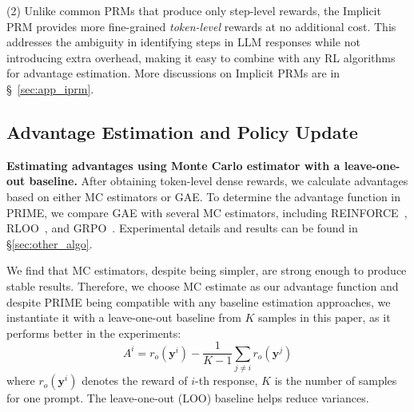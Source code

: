 (2) Unlike common PRMs that produce only step-level rewards, the Implicit PRM provides more fine-grained \textit{token-level} rewards at no additional cost. This addresses the ambiguity in identifying steps in LLM responses while not introducing extra overhead, making it easy to combine with any RL algorithms for advantage estimation. More discussions on Implicit PRMs are in \S~\ref{sec:app_iprm}.

\subsection{Advantage Estimation and Policy Update}
\label{sec:prime_loss_adv}



\textbf{Estimating advantages using Monte Carlo estimator with a leave-one-out baseline.}
After obtaining token-level dense rewards, we calculate advantages based on either MC estimators or GAE.
To determine the advantage function in PRIME, we compare GAE with several MC estimators, including REINFORCE~\citep{williams1992simple}, RLOO~\citep{ahmadian2024back}, and GRPO~\citep{deepseek-math}. Experimental details and results can be found in \S \ref{sec:other_algo}.

We find that MC estimators, despite being simpler, are strong enough to produce stable results. Therefore, we choose MC estimate as our advantage function and despite PRIME being compatible with any baseline estimation approaches, we instantiate it with a leave-one-out baseline from $K$ samples \citep{ahmadian2024back} in this paper, as it performs better in the experiments:
\begin{equation}
    A^i = r_o(\mathbf{y}^i)-\frac{1}{K-1} \sum_{j \neq i}r_o(\mathbf{y}^j)
\end{equation}
where $r_o(\mathbf{y}^i)$ denotes the reward of $i$-th response, $K$ is the number of samples for one prompt. The leave-one-out (LOO) baseline helps reduce variances.


